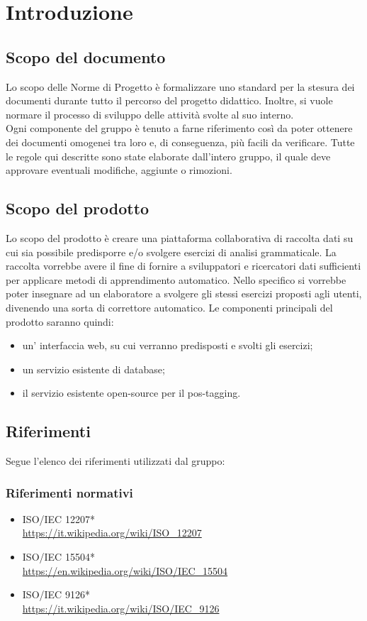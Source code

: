 \documentclass[11pt,a4paper]{article}
\begin{document}
	\newpage	

	\renewcommand  \contentsname {\Large Indice} 
	
	\tableofcontents
	\newpage
	
	\section{Introduzione}
	\subsection{Scopo del documento}
	Lo scopo delle Norme di Progetto è formalizzare uno standard per la stesura dei documenti durante tutto il percorso del progetto didattico. Inoltre, si vuole normare il processo di sviluppo delle attività svolte al suo interno. 
	\\Ogni componente del gruppo è tenuto a farne riferimento così da poter ottenere dei documenti omogenei tra loro e, di conseguenza, più facili da verificare. 
	Tutte le regole qui descritte sono state elaborate dall'intero gruppo, il quale deve approvare eventuali modifiche, aggiunte o rimozioni.
	\subsection{Scopo del prodotto}
	Lo scopo del prodotto è creare una piattaforma collaborativa di raccolta dati su cui sia possibile predisporre e/o svolgere esercizi di analisi grammaticale. La raccolta vorrebbe avere il fine di fornire a sviluppatori e ricercatori dati sufficienti per applicare metodi di apprendimento automatico. Nello specifico si vorrebbe poter insegnare ad un elaboratore a svolgere gli stessi esercizi proposti agli utenti, divenendo una sorta di correttore automatico.  
	Le componenti principali del prodotto saranno quindi:
	\begin{itemize}
		\item un' interfaccia web, su cui verranno predisposti e svolti gli esercizi;
		\item un servizio esistente di database;
		\item il servizio esistente open-source per il pos-tagging.
	\end{itemize}
	
	\subsection{Riferimenti}
	Segue l'elenco dei riferimenti utilizzati dal gruppo:
	\subsubsection{Riferimenti normativi}
	\begin{itemize}
		\item ISO/IEC 12207* \\
		\url {https://it.wikipedia.org/wiki/ISO\_12207}
		\item ISO/IEC 15504* \\
		\url {https://en.wikipedia.org/wiki/ISO/IEC\_15504}
		\item ISO/IEC 9126* \\
		\url {https://it.wikipedia.org/wiki/ISO/IEC\_9126}
	\end{itemize}	
	
\end{document}
